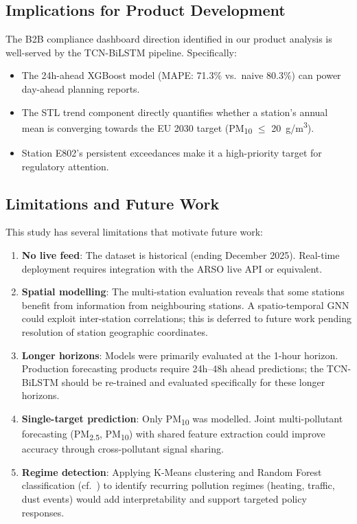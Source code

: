 \documentclass[runningheads]{llncs}
\begin{document}
\subsection{Implications for Product Development}
The B2B compliance dashboard direction identified in our product
analysis is well-served by the TCN-BiLSTM pipeline. Specifically:
\begin{itemize}
  \item The 24h-ahead XGBoost model (MAPE: 71.3\% vs.\ naive 80.3\%)
        can power day-ahead planning reports.
  \item The STL trend component directly quantifies whether a station's
        annual mean is converging towards the EU 2030 target
        (PM\textsubscript{10} $\le$ 20~\textmu{}g/m\textsuperscript{3}).
  \item Station E802's persistent exceedances make it a high-priority
        target for regulatory attention.
\end{itemize}

\subsection{Limitations and Future Work}
This study has several limitations that motivate future work:

\begin{enumerate}
  \item \textbf{No live feed}: The dataset is historical (ending December
        2025). Real-time deployment requires integration with the ARSO
        live API or equivalent.
  \item \textbf{Spatial modelling}: The multi-station evaluation reveals
        that some stations benefit from information from neighbouring
        stations. A spatio-temporal GNN \cite{ref_stgraph_beijing,ref_stgnn_pm25}
        could exploit inter-station correlations; this is deferred to
        future work pending resolution of station geographic coordinates.
  \item \textbf{Longer horizons}: Models were primarily evaluated at the
        1-hour horizon. Production forecasting products require 24h–48h
        ahead predictions; the TCN-BiLSTM should be re-trained and
        evaluated specifically for these longer horizons.
  \item \textbf{Single-target prediction}: Only PM\textsubscript{10}
        was modelled. Joint multi-pollutant forecasting (PM\textsubscript{2.5},
        PM\textsubscript{10}) with shared feature extraction could improve
        accuracy through cross-pollutant signal sharing.
  \item \textbf{Regime detection}: Applying K-Means clustering and
        Random Forest classification (cf.\ \cite{ref_cairo_cluster}) to
        identify recurring pollution regimes (heating, traffic, dust events)
        would add interpretability and support targeted policy responses.
\end{enumerate}
\end{document}
